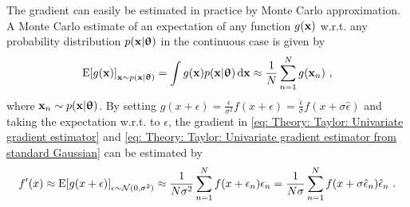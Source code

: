 The gradient can easily be estimated in practice by Monte Carlo approximation. A Monte Carlo estimate of an expectation of any function $g({\mathbf{x}})$ w.r.t. any probability distribution $p({\mathbf{x}}|{\boldsymbol{\uptheta}})$ in the continuous case is given by \cite{Murphy2012}
\begin{equation}
    \label{eq: Theory: Monte Carlo approximation}
    \text{E}\bra{g(\x)}_{\x\sim p(\x|\thetab)} = \int g(\x)p(\x|\thetab)\,\text{d}\x \approx \frac{1}{N}\sum_{n=1}^N g(\x_n) \ ,
\end{equation}
where ${\mathbf{x}}_n\sim p({\mathbf{x}}|{\boldsymbol{\uptheta}})$. 
By setting $g(x+\epsilon)=\frac{\epsilon}{\sigma^2}f(x+\epsilon) = \frac{\hat{\epsilon}}{\sigma}f(x+\sigma\hat{\epsilon})$ and taking the expectation w.r.t. to $\epsilon$, the gradient in \eqref{eq: Theory: Taylor: Univariate gradient estimator} and \eqref{eq: Theory: Taylor: Univariate gradient estimator from standard Gaussian} can be estimated by
\begin{equation}\label{eq: Theory: Taylor: Univariate gradient estimator monte carlo}
    f'(x) \approx \text{E}{\left[g(x+\epsilon)\right]}_{\epsilon\sim\mathcal{N}(0,\sigma^2)} \approx \frac{1}{N\sigma^2}\sum_{n=1}^N f(x+\epsilon_n)\epsilon_n = \frac{1}{N\sigma}\sum_{n=1}^N f(x+\sigma\hat{\epsilon}_n)\hat{\epsilon}_n \ .
\end{equation}


